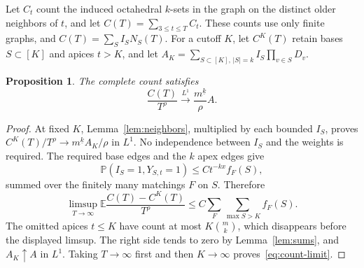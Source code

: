 \documentclass[11pt]{article}
\newtheorem{proposition}[theorem]{Proposition}
\theoremstyle{remark}\newtheorem{remark}[theorem]{Remark}
\newcommand{\E}{\mathbb E}
\newcommand{\Prob}{\mathbb P}
\newcommand{\fall}[2]{#1^{\underline{#2}}}
\begin{document}
Let $C_t$ count the induced octahedral $k$-sets in the graph on the
distinct older neighbors of $t$, and let $C(T)=\sum_{3\le t\le T}C_t$.
These counts use only finite graphs, and
$C(T)=\sum_S I_S N_S(T)$.
For a cutoff $K$, let $C^K(T)$ retain bases $S\subset[K]$ and apices $t>K$,
and let $A_K=\sum_{S\subset[K],\,|S|=k}I_S\prod_{v\in S}D_v$.

\begin{proposition}\label{prop:count}
The complete count satisfies
\begin{equation}\label{eq:count-limit}
 \frac{C(T)}{T^\rho}\xrightarrow{L^1}\frac{\fall{m}{k}}\rho A.
\end{equation}
\end{proposition}
\begin{proof}
At fixed $K$, Lemma~\ref{lem:neighbors}, multiplied by each bounded
$I_S$, proves $C^K(T)/T^\rho\to\fall{m}{k}A_K/\rho$ in $L^1$.
No independence between $I_S$ and the weights is required.
The required base edges and the $k$ apex edges give
\[
 \Prob(I_S=1,Y_{S,t}=1)\le C t^{-kx} f_F(S),
\]
summed over the finitely many matchings $F$ on $S$. Therefore
\begin{equation}\label{eq:cutoff-count}
 \limsup_{T\to\infty}\E\frac{C(T)-C^K(T)}{T^\rho}
 \le C\sum_F\sum_{\max S>K} f_F(S).
\end{equation}
The omitted apices $t\le K$ have count at most
$K\binom{m}{k}$, which disappears before the displayed limsup.
The right side tends to zero by Lemma~\ref{lem:sums}, and
$A_K\uparrow A$ in $L^1$. Taking $T\to\infty$ first and then
$K\to\infty$ proves~\eqref{eq:count-limit}.
\end{proof}
\end{document}
